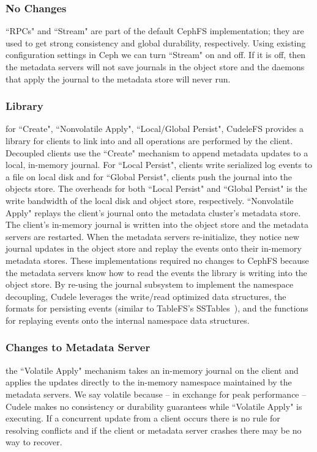 \subsubsection{No Changes} ``RPCs" and ``Stream" are part of the default CephFS
implementation; they are used to get strong consistency and global durability,
respectively.  Using existing configuration settings in Ceph we can turn
``Stream" on and off.  If it is off, then the metadata servers will not save
journals in the object store and the daemons that apply the journal to the
metadata store will never run.

\subsubsection{Library} for ``Create", ``Nonvolatile Apply", ``Local/Global
Persist", CudeleFS provides a library for clients to link into and all
operations are performed by the client.  Decoupled clients use the ``Create"
mechanism to append metadata updates to a local, in-memory journal.  For
``Local Persist", clients write serialized log events to a file on local disk
and for ``Global Persist", clients push the journal into the objects store. The
overheads for both ``Local Persist" and ``Global Persist" is the write
bandwidth of the local disk and object store, respectively.  ``Nonvolatile
Apply" replays the client's journal onto the metadata cluster's metadata store.
The client's in-memory journal is written into the object store and the
metadata servers are restarted. When the metadata servers re-initialize, they
notice new journal updates in the object store and replay the events onto their
in-memory metadata stores.  These implementations required no changes to CephFS
because the metadata servers know how to read the events the library is writing
into the object store.  By re-using the journal subsystem to implement the
namespace decoupling, Cudele leverages the write/read optimized data
structures, the formats for persisting events (similar to TableFS's
SSTables~\cite{ren:atc2013-tablefs}), and the functions for replaying events
onto the internal namespace data structures.

\subsubsection{Changes to Metadata Server} the ``Volatile Apply" mechanism
takes an in-memory journal on the client and applies the updates directly to
the in-memory namespace maintained by the metadata servers. We say volatile
because -- in exchange for peak performance -- Cudele makes no consistency or
durability guarantees while ``Volatile Apply" is executing.  If a concurrent
update from a client occurs there is no rule for resolving conflicts and if the
client or metadata server crashes there may be no way to recover.

